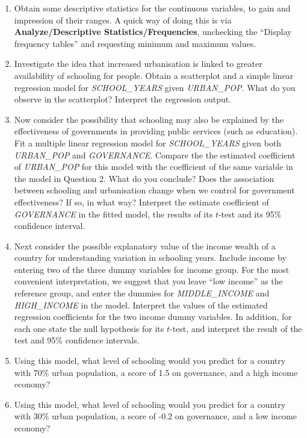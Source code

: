 \documentclass[11pt,a4paper,openany]{book}
\begin{document}
\begin{enumerate}
\def\labelenumi{\arabic{enumi}.}
\item
  Obtain some descriptive statistics for the continuous variables, to
  gain and impression of their ranges. A quick way of doing this is via
  \textbf{Analyze/Descriptive Statistics/Frequencies}, unchecking the
  ``Display frequency tables'' and requesting minimum and maximum
  values.
\item
  Investigate the idea that increased urbanisation is linked to greater
  availability of schooling for people. Obtain a scatterplot and a
  simple linear regression model for \emph{SCHOOL\_YEARS} given
  \emph{URBAN\_POP}. What do you observe in the scatterplot? Interpret
  the regression output.
\item
  Now consider the possibility that schooling may also be explained by
  the effectiveness of governments in providing public services (such as
  education). Fit a multiple linear regression model for
  \emph{SCHOOL\_YEARS} given both \emph{URBAN\_POP} and
  \emph{GOVERNANCE}. Compare the the estimated coefficient of
  \emph{URBAN\_POP} for this model with the coefficient of the same
  variable in the model in Question 2. What do you conclude? Does the
  association between schooling and urbanisation change when we control
  for government effectiveness? If so, in what way? Interpret the
  estimate coefficient of \emph{GOVERNANCE} in the fitted model, the
  results of its \(t\)-test and its 95\% confidence interval.
\item
  Next consider the possible explanatory value of the income wealth of a
  country for understanding variation in schooling years. Include income
  by entering two of the three dummy variables for income group. For the
  most convenient interpretation, we suggest that you leave ``low
  income'' as the reference group, and enter the dummies for
  \emph{MIDDLE\_INCOME} and \emph{HIGH\_INCOME} in the model. Interpret
  the values of the estimated regression coefficients for the two income
  dummy variables. In addition, for each one state the null hypothesis
  for its \(t\)-test, and interpret the result of the test and 95\%
  confidence intervals.
\item
  Using this model, what level of schooling would you predict for a
  country with 70\% urban population, a score of 1.5 on governance, and
  a high income economy?
\item
  Using this model, what level of schooling would you predict for a
  country with 30\% urban population, a score of -0.2 on governance, and
  a low income economy?
\end{enumerate}
\end{document}

